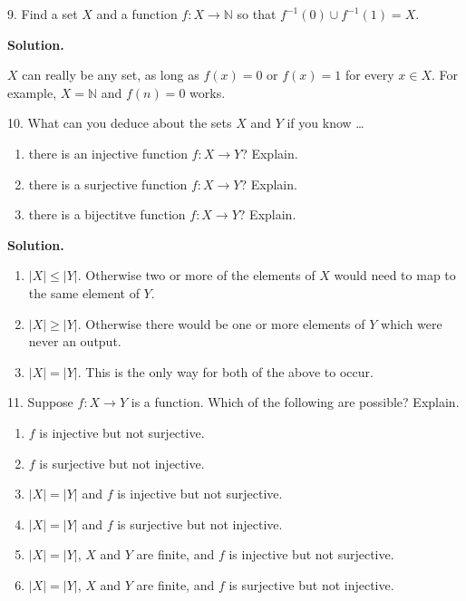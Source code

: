 \documentclass[10pt,]{book}
\theoremstyle{plain}
\theoremstyle{definition}
\theoremstyle{definition}
\theoremstyle{definition}
\def\N{\mathbb N}
\def\inv{^{-1}}
\begin{document}
\begin{exerciselist}
\item[9.]\hypertarget{exercise-35}{}
            Find a set \(X\) and a function \(f:X \to \N\) so that \(f\inv(0) \cup f\inv(1) = X\).
\par\smallskip
\par\smallskip
\noindent\textbf{Solution.}\hypertarget{solution-53}{}\quad

            \(X\) can really be any set, as long as \(f(x) = 0\) or \(f(x) = 1\) for every \(x \in X\). For example, \(X = \N\) and \(f(n) = 0\) works.
\item[10.]\hypertarget{exercise-36}{}
            What can you deduce about the sets \(X\) and \(Y\) if you know
            \dots{}
\leavevmode%
\begin{enumerate}[label=(\alph*)]
\item\hypertarget{li-339}{}
                there is an injective function \(f:X \to Y\)? Explain.
\item\hypertarget{li-340}{}
                there is a surjective function \(f:X \to Y\)? Explain.
\item\hypertarget{li-341}{}
                there is a bijectitve function \(f:X \to Y\)? Explain.
\end{enumerate}
\par\smallskip
\par\smallskip
\noindent\textbf{Solution.}\hypertarget{solution-54}{}\quad
\leavevmode%
\begin{enumerate}[label=(\alph*)]
\item\hypertarget{li-342}{}\(|X| \le |Y|\). Otherwise two or more of the elements of \(X\) would need to map to the same element of \(Y\).\item\hypertarget{li-343}{}\(|X| \ge |Y|\). Otherwise there would be one or more elements of \(Y\) which were never an output.\item\hypertarget{li-344}{}\(|X| = |Y|\). This is the only way for both of the above to occur.\end{enumerate}
\item[11.]\hypertarget{exercise-37}{}
            Suppose \(f:X \to Y\) is a function. Which of the following are possible? Explain.
\leavevmode%
\begin{enumerate}[label=(\alph*)]
\item\hypertarget{li-345}{}\(f\) is injective but not surjective.\item\hypertarget{li-346}{}\(f\) is surjective but not injective.\item\hypertarget{li-347}{}\(|X| = |Y|\) and \(f\) is injective but not surjective.\item\hypertarget{li-348}{}\(|X| = |Y|\) and \(f\) is surjective but not injective.\item\hypertarget{li-349}{}\(|X| = |Y|\), \(X\) and \(Y\) are finite, and \(f\) is injective but not surjective.\item\hypertarget{li-350}{}\(|X| = |Y|\), \(X\) and \(Y\) are finite, and \(f\) is surjective but not injective.\end{enumerate}

\end{exerciselist}
\end{document}
